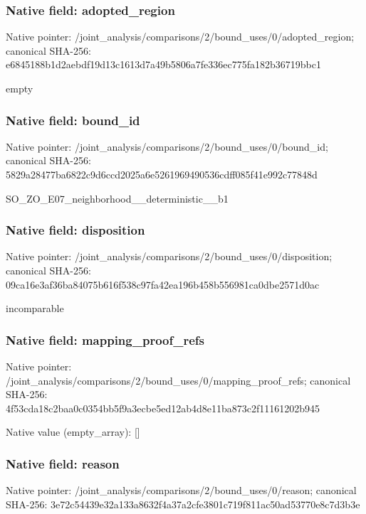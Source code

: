 \documentclass[10pt,a4paper]{article}
\begin{document}
\subsubsection{Native field: adopted\_\allowbreak{}region}
Native pointer: /joint\_\allowbreak{}analysis/comparisons/2/bound\_\allowbreak{}uses/0/adopted\_\allowbreak{}region; canonical SHA-256: e6845188b1d2aebdf19d13c1613d7a49b5806a7fe336ec775fa182b36719bbc1

\begingroup\raggedright\sloppy empty\par\endgroup

\subsubsection{Native field: bound\_\allowbreak{}id}
Native pointer: /joint\_\allowbreak{}analysis/comparisons/2/bound\_\allowbreak{}uses/0/bound\_\allowbreak{}id; canonical SHA-256: 5829a28477ba6822c9d6ccd2025a6e5261969490536cdff085f41e992c77848d

\begingroup\raggedright\sloppy SO\_\allowbreak{}ZO\_\allowbreak{}E07\_\allowbreak{}neighborhood\_\allowbreak{}\_\allowbreak{}deterministic\_\allowbreak{}\_\allowbreak{}b1\par\endgroup

\subsubsection{Native field: disposition}
Native pointer: /joint\_\allowbreak{}analysis/comparisons/2/bound\_\allowbreak{}uses/0/disposition; canonical SHA-256: 09ca16e3af36ba84075b616f538c97fa42ea196b458b556981ca0dbe2571d0ac

\begingroup\raggedright\sloppy incomparable\par\endgroup

\subsubsection{Native field: mapping\_\allowbreak{}proof\_\allowbreak{}refs}
Native pointer: /joint\_\allowbreak{}analysis/comparisons/2/bound\_\allowbreak{}uses/0/mapping\_\allowbreak{}proof\_\allowbreak{}refs; canonical SHA-256: 4f53cda18c2baa0c0354bb5f9a3ecbe5ed12ab4d8e11ba873c2f11161202b945

Native value (empty\_\allowbreak{}array): []

\subsubsection{Native field: reason}
Native pointer: /joint\_\allowbreak{}analysis/comparisons/2/bound\_\allowbreak{}uses/0/reason; canonical SHA-256: 3e72c54439e32a133a8632f4a37a2cfe3801c719f811ac50ad53770e8c7d3b3e
\end{document}
